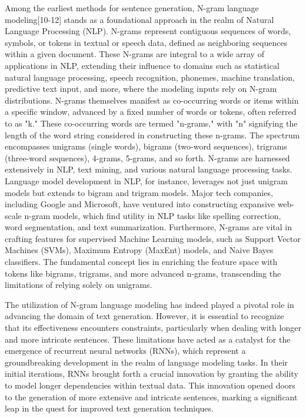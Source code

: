 \documentclass[conference]{IEEEtran}
\begin{document}
Among the earliest methods for sentence generation, N-gram language modeling[10-12] stands as a foundational approach in the realm of Natural Language Processing (NLP). N-grams represent contiguous sequences of words, symbols, or tokens in textual or speech data, defined as neighboring sequences within a given document. These N-grams are integral to a wide array of applications in NLP, extending their influence to domains such as statistical natural language processing, speech recognition, phonemes, machine translation, predictive text input, and more, where the modeling inputs rely on N-gram distributions. N-grams themselves manifest as co-occurring words or items within a specific window, advanced by a fixed number of words or tokens, often referred to as "k." These co-occurring words are termed "n-grams," with "n" signifying the length of the word string considered in constructing these n-grams. The spectrum encompasses unigrams (single words), bigrams (two-word sequences), trigrams (three-word sequences), 4-grams, 5-grams, and so forth. N-grams are harnessed extensively in NLP, text mining, and various natural language processing tasks. Language model development in NLP, for instance, leverages not just unigram models but extends to bigram and trigram models. Major tech companies, including Google and Microsoft, have ventured into constructing expansive web-scale n-gram models, which find utility in NLP tasks like spelling correction, word segmentation, and text summarization. Furthermore, N-grams are vital in crafting features for supervised Machine Learning models, such as Support Vector Machines (SVMs), Maximum Entropy (MaxEnt) models, and Naive Bayes classifiers. The fundamental concept lies in enriching the feature space with tokens like bigrams, trigrams, and more advanced n-grams, transcending the limitations of relying solely on unigrams.




The utilization of N-gram language modeling has indeed played a pivotal role in advancing the domain of text generation. However, it is essential to recognize that its effectiveness encounters constraints, particularly when dealing with longer and more intricate sentences. These limitations have acted as a catalyst for the emergence of recurrent neural networks (RNNs), which represent a groundbreaking development in the realm of language modeling tasks. In their initial iterations, RNNs brought forth a crucial innovation by granting the ability to model longer dependencies within textual data. This innovation opened doors to the generation of more extensive and intricate sentences, marking a significant leap in the quest for improved text generation techniques.
\end{document}
